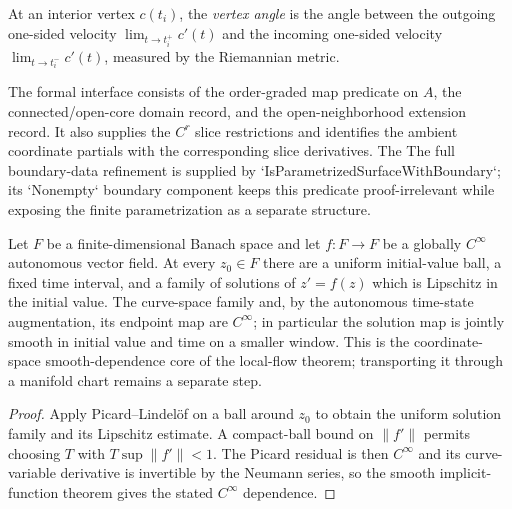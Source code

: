 \begin{definition}
  \label{def:dc-ch3-3-1-vertex-angle}


  At an interior vertex $c(t_i)$, the \emph{vertex angle} is the angle between the outgoing
  one-sided velocity $\lim_{t\to t_i^+}c'(t)$ and the incoming one-sided velocity
  $\lim_{t\to t_i^-}c'(t)$, measured by the Riemannian metric.
\end{definition}

\begin{definition}
  \label{def:dc-ch3-3-3-formal}


  The formal interface consists of the order-graded map predicate on $A$,
  the connected/open-core domain record, and the open-neighborhood extension
  record.  It also supplies the $C^r$ slice restrictions and identifies the
  ambient coordinate partials with the corresponding slice derivatives.  The
  The full boundary-data refinement is supplied by
  `IsParametrizedSurfaceWithBoundary`; its `Nonempty` boundary component keeps
  this predicate proof-irrelevant while exposing the finite parametrization as
  a separate structure.
\end{definition}

\begin{lemma}
  \label{lem:dc-ch3-2-2-cinfty}


  Let $F$ be a finite-dimensional Banach space and let $f:F\to F$ be a globally
  $C^\infty$ autonomous vector field.  At every $z_0\in F$ there are a uniform
  initial-value ball, a fixed time interval, and a family of solutions of
  $z'=f(z)$ which is Lipschitz in the initial value.  The curve-space family and,
  by the autonomous time-state augmentation, its endpoint map are $C^\infty$;
  in particular the solution map is jointly smooth in initial value and time on
  a smaller window.  This is the coordinate-space smooth-dependence core of the
  local-flow theorem; transporting it through a manifold chart remains a
  separate step.
\end{lemma}
\begin{proof}

  Apply Picard--Lindelöf on a ball around $z_0$ to obtain the uniform solution
  family and its Lipschitz estimate.  A compact-ball bound on $\|f'\|$ permits
  choosing $T$ with $T\sup\|f'\|<1$.  The Picard residual is then $C^\infty$ and
  its curve-variable derivative is invertible by the Neumann series, so the
  smooth implicit-function theorem gives the stated $C^\infty$ dependence.
\end{proof}

